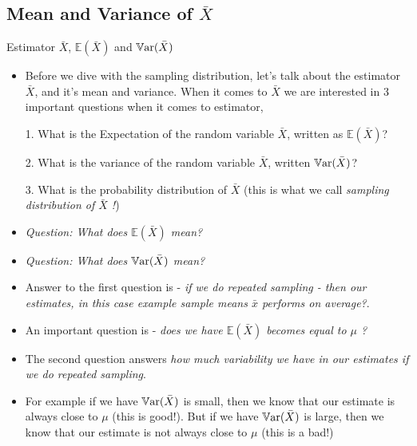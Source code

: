 \documentclass[8pt, usepdftitle=false]{beamer}
\begin{document}
\subsection{Mean and Variance of $\bar{X}$}
\frame{\subsectionpage}
\begin{frame}[allowframebreaks]{Estimator $\bar{X}$, $\mathbb{E}(\bar{X})$ and $\mathbb{V}\mathrm{ar}{(}\bar{X})$}



\begin{itemize}
  \item Before we dive with the sampling distribution, let's talk about the estimator $\bar{X}$, and it's mean and variance. When it comes to $\bar{X}$ we are interested in 3 important questions when it comes to estimator,

  \medskip


    \item[1.] What is the Expectation of the random variable $ \bar{X}$, written as $\mathbb{E}(\bar{X})$? 
    \item[2.] What is the variance of the random variable $ \bar{X}$, written $\mathbb{V}\mathrm{ar}{(}\bar{X})$?
    \item[3.] What is the probability distribution of $ \bar{X}$ (this is what we call \emph{sampling distribution of $ \bar{X}$ !})


  \framebreak

  \item \emph{Question: What does $\mathbb{E}(\bar{X})$ mean?}


  \item \emph{Question: What does $\mathbb{V}\mathrm{ar}{(}\bar{X})$ mean?}

  \item Answer to the first question is - \emph{if we do repeated sampling - then our estimates, in this case  example sample means $\bar{x}$ performs on average?}. 

  \item An important question is - \emph{does we have $\mathbb{E}( \bar{X})$ becomes equal to $\mu$ ?}


  \framebreak 


  \item The second question answers \emph{how much variability we have in our estimates if we do repeated sampling}. 

  \item For example if we have $\mathbb{V}\mathrm{ar}{(}\bar{X})$ is small, then we know that our estimate is always close to $\mu$ (this is good!). But if we have $\mathbb{V}\mathrm{ar}{(}\bar{X})$ is large, then we know that our estimate is not always close to $\mu$ (this is a bad!)



\end{itemize}
\end{frame}
\end{document}
